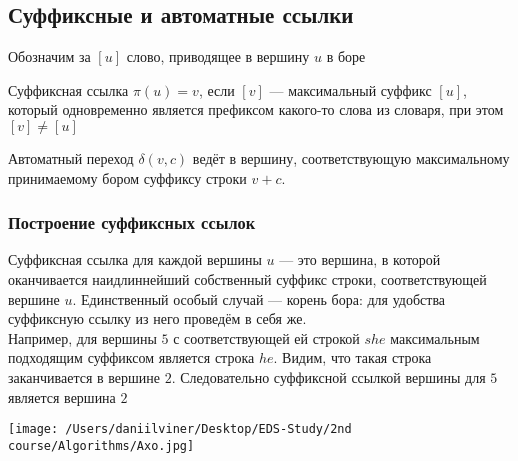 \documentclass[a4paper]{article}
\begin{document}
\subsection{Суффиксные и автоматные ссылки}
Обозначим за $[u]$ слово, приводящее в вершину $u$ в боре


 Суффиксная ссылка $\pi(u)=v$, если $[v]$ — максимальный суффикс $[u]$, который одновременно является префиксом какого-то слова из словаря, при этом $[v]\ne[u]$

 Автоматный переход $\delta(v, c)$ ведёт в вершину, соответствующую максимальному принимаемому бором суффиксу строки $v + c$.

\subsubsection{Построение суффиксных ссылок}
\begin{minipage}{0.5\textwidth}
    Суффиксная ссылка для каждой вершины $u$ — это вершина, в которой оканчивается наидлиннейший собственный суффикс строки, соответствующей вершине $u$. Единственный особый случай — корень бора: для удобства суффиксную ссылку из него проведём в себя же.\\[2mm]
    Например, для вершины $5$ с соответствующей ей строкой $she$ максимальным подходящим суффиксом является строка $he$. Видим, что такая строка заканчивается в вершине $2$. Следовательно суффиксной ссылкой вершины для $5$ является вершина $2$
\end{minipage}
\begin{minipage}{0.5\textwidth}
    \begin{center}
        \texttt{[image: /Users/daniilviner/Desktop/EDS-Study/2nd course/Algorithms/Axo.jpg]}
    \end{center}
\end{minipage}
\end{document}
